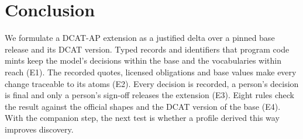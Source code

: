 \section{Conclusion}\label{sec:conclusion}

We formulate a \acs{DCAT-AP} extension as a justified delta over a pinned base release and its DCAT version.
Typed records and identifiers that program code mints keep the model's decisions within the base and
the vocabularies within reach (E1). The recorded quotes, licensed obligations and base values make every change
traceable to its atoms (E2). Every decision is recorded, a person's decision is final and only a person's sign-off
releases the extension (E3). Eight rules check the result against the official shapes and the DCAT version of the %
base (E4).
With the companion step, the next test is whether a profile derived this way improves discovery.
